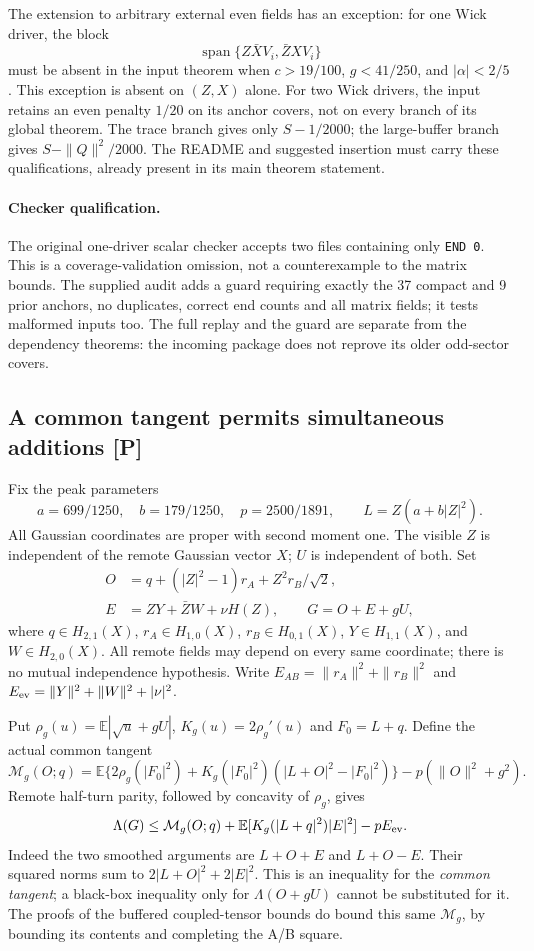 The extension to arbitrary external even fields has an exception:
for one Wick driver, the block
\[
 \operatorname{span}\{Z\bar X V_i,\bar Z X V_i\}
\]
must be absent in the input theorem when
$c>19/100$, $g<41/250$, and $|\alpha|<2/5$.
This exception is absent on $(Z,X)$ alone. For two Wick drivers,
the input retains an even penalty $1/20$ on its anchor covers, not on
every branch of its global theorem. The trace branch gives only
$S-1/2000$; the large-buffer branch gives
$S-\|Q\|^2/2000$. The README and suggested insertion must carry these
qualifications, already present in its main theorem statement.

\paragraph{Checker qualification.}
The original one-driver scalar checker accepts two files containing only
\texttt{END 0}. This is a coverage-validation omission, not a
counterexample to the matrix bounds. The supplied audit adds a guard
requiring exactly the 37 compact and 9 prior anchors, no duplicates,
correct end counts and all matrix fields; it tests malformed inputs too.
The full replay and the guard are separate from the dependency theorems:
the incoming package does not reprove its older odd-sector covers.

\subsection{A common tangent permits simultaneous additions [P]}
Fix the peak parameters
\[
 a=699/1250,\quad b=179/1250,\quad p=2500/1891,
 \qquad L=Z(a+b|Z|^2).
\]
All Gaussian coordinates are proper with second moment one.
The visible $Z$ is independent of the remote Gaussian vector $X$;
$U$ is independent of both. Set
\[
 \begin{split}
 O&=q+(|Z|^2-1)r_A+Z^2r_B/\sqrt2,\\
 E&=ZY+\bar ZW+\nu H(Z),\qquad
 G=O+E+gU,
 \end{split}
\]
where $q\in H_{2,1}(X)$, $r_A\in H_{1,0}(X)$,
$r_B\in H_{0,1}(X)$, $Y\in H_{1,1}(X)$, and
$W\in H_{2,0}(X)$. All remote fields may depend on every same
coordinate; there is no mutual independence hypothesis.
Write $E_{AB}=\|r_A\|^2+\|r_B\|^2$ and
$E_{\rm ev}=\|Y\|^2+\|W\|^2+|\nu|^2$.

Put $\rho_g(u)=\mathbb E|\sqrt u+gU|$,
$K_g(u)=2\rho_g'(u)$ and $F_0=L+q$. Define the actual common tangent
\[
 \mathcal M_g(O;q)=\mathbb E\{2\rho_g(|F_0|^2)
       +K_g(|F_0|^2)(|L+O|^2-|F_0|^2)\}
       -p(\|O\|^2+g^2).
\]
Remote half-turn parity, followed by concavity of $\rho_g$, gives
\begin{equation}\label{eq:ase-parity}
 \Lambda(G)\le\mathcal M_g(O;q)
       +\mathbb E[K_g(|L+q|^2)|E|^2]-pE_{\rm ev}.
\end{equation}
Indeed the two smoothed arguments are $L+O+E$ and $L+O-E$.
Their squared norms sum to $2|L+O|^2+2|E|^2$.
This is an inequality for the \emph{common tangent}; a black-box
inequality only for $\Lambda(O+gU)$ cannot be substituted for it.
The proofs of the buffered coupled-tensor bounds do bound this same
$\mathcal M_g$, by bounding its contents and completing the A/B square.

